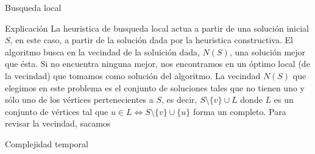 \begin{section}{Busqueda local}
		\begin{subsection}{Explicación}
			La heuristica de busqueda local actua a partir de una solución inicial $S$, en este caso, a partir de la solución dada por la heuristica constructiva. El algoritmo busca en la vecindad de la soluición dada, $N(S)$, una solución mejor que ésta. Si no encuentra ninguna mejor, nos encontramos en un óptimo local (de la vecindad) que tomamos como solución del algoritmo.
			La vecindad $N(S)$ que elegimos en este problema es el conjunto de soluciones tales que no tienen uno y sólo uno de los vértices pertenecientes a $S$, es decir, $S \setminus \{v\} \cup L$ donde $L$ es un conjunto de vértices tal que $u \in L \Longleftrightarrow S \setminus \{v\} \cup \{u\}$ forma un completo.
			Para revisar la vecindad, sacamos 
		\end{subsection}
		\begin{subsection}{Complejidad temporal}
		\end{subsection}
\end{section}
